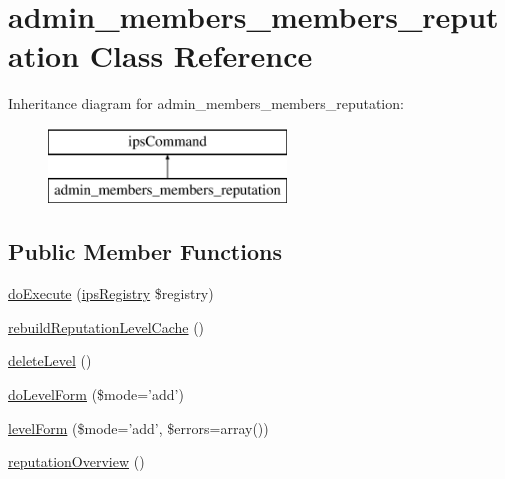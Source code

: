 \hypertarget{classadmin__members__members__reputation}{\section{admin\-\_\-members\-\_\-members\-\_\-reputation Class Reference}
\label{classadmin__members__members__reputation}
}
Inheritance diagram for admin\-\_\-members\-\_\-members\-\_\-reputation\-:\begin{figure}[H]
\begin{center}
\leavevmode
\includegraphics[height=2.000000cm]{classadmin__members__members__reputation}
\end{center}
\end{figure}
\subsection*{Public Member Functions}
\begin{DoxyCompactItemize}
\item 
\hyperlink{classadmin__members__members__reputation_afbc4e912a0604b94d47d66744c64d8ba}{do\-Execute} (\hyperlink{classips_registry}{ips\-Registry} \$registry)
\item 
\hyperlink{classadmin__members__members__reputation_a222a5a3b195c6462335bb1a0f7986668}{rebuild\-Reputation\-Level\-Cache} ()
\item 
\hyperlink{classadmin__members__members__reputation_a665bf90ef13012bb6b021291149cb3ba}{delete\-Level} ()
\item 
\hyperlink{classadmin__members__members__reputation_aa5be1e7bb660246d93cec0a5cc792fd4}{do\-Level\-Form} (\$mode='add')
\item 
\hyperlink{classadmin__members__members__reputation_a4b2757ad36d94d66ff9b8e1b37813414}{level\-Form} (\$mode='add', \$errors=array())
\item 
\hyperlink{classadmin__members__members__reputation_a64a0839361c611db177f0dedba7f7d4e}{reputation\-Overview} ()
\end{DoxyCompactItemize}
